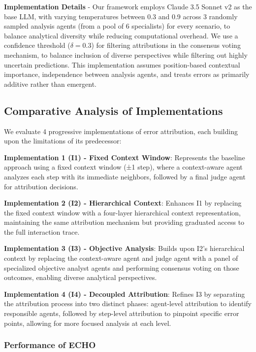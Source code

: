 \documentclass{article}
\begin{document}
\textbf{Implementation Details} - Our framework employs Claude 3.5 Sonnet v2 as the base LLM, with varying temperatures between 0.3 and 0.9 across 3 randomly sampled analysis agents (from a pool of 6 specialists) for every scenario, to balance analytical diversity while reducing computational overhead. We use a confidence threshold ($\delta = 0.3$) for filtering attributions in the consensus voting mechanism, to balance inclusion of diverse perspectives while filtering out highly uncertain predictions. This implementation assumes position-based contextual importance, independence between analysis agents, and treats errors as primarily additive rather than emergent.

\subsection{Comparative Analysis of Implementations}

We evaluate 4 progressive implementations of error attribution, each building upon the limitations of its predecessor:

\textbf{Implementation 1 (I1) - Fixed Context Window}:
Represents the baseline approach using a fixed context window (±1 step), where a context-aware agent analyzes each step with its immediate neighbors, followed by a final judge agent for attribution decisions.

\textbf{Implementation 2 (I2) - Hierarchical Context}:
Enhances I1 by replacing the fixed context window with a four-layer hierarchical context representation, maintaining the same attribution mechanism but providing graduated access to the full interaction trace.

\textbf{Implementation 3 (I3) - Objective Analysis}:
Builds upon I2's hierarchical context by replacing the context-aware agent and judge agent with a panel of specialized objective analyst agents and performing consensus voting on those outcomes, enabling diverse analytical perspectives.

\textbf{Implementation 4 (I4) - Decoupled Attribution}:
Refines I3 by separating the attribution process into two distinct phases: agent-level attribution to identify responsible agents, followed by step-level attribution to pinpoint specific error points, allowing for more focused analysis at each level.

\subsubsection{Performance of ECHO}
\end{document}
